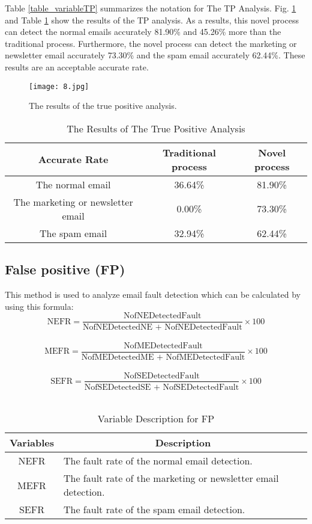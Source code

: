 \documentclass[conference]{IEEEtran}
\begin{document}
Table \ref{table_variableTP} summarizes the notation for The TP Analysis.
Fig. \ref{fig:resultTP} and Table \ref{table_resultsTP} show the results of the TP
analysis.
As a
results, this novel process can detect the normal emails accurately 81.90\% and 45.26\% more than the traditional process.
Furthermore, the novel process can detect the marketing or newsletter email accurately 73.30\% and the spam email accurately 62.44\%.
These results are an acceptable accurate
rate.

\begin{figure}
\centering
\texttt{[image: 8.jpg]}
\caption{The results of the true positive analysis.}
\label{fig:resultTP}
\end{figure}

\begin{table}[!t]
\renewcommand{\arraystretch}{1.2}
\caption{The Results of The True Positive Analysis}
\label{table_resultsTP}
\centering
\begin{tabular}{c|c|c}
\hline
\bfseries Accurate Rate & \bfseries Traditional process & \bfseries Novel process\\
\hline
The normal email & 36.64\% & 81.90\%\\
\hline
The marketing or newsletter email & 0.00\% & 73.30\%\\
\hline
The spam email & 32.94\% & 62.44\%\\
\hline
\end{tabular}
\end{table}

\subsection{False positive (FP)}
This method is used to analyze email fault detection which can be calculated by using this formula:\\
$$ \text{NEFR} =  \frac{\text{NofNEDetectedFault}}{\text{NofNEDetectedNE + NofNEDetectedFault}} \times 100 $$\\
$$ \text{MEFR} =  \frac{\text{NofMEDetectedFault}}{\text{NofMEDetectedME + NofMEDetectedFault}} \times 100 $$\\
$$ \text{SEFR} =  \frac{\text{NofSEDetectedFault}}{\text{NofSEDetectedSE + NofSEDetectedFault}} \times 100 $$\\

\begin{table}[!t]
\renewcommand{\arraystretch}{1.2}
\caption{Variable Description for FP}
\label{table_variableFP}
\centering
\begin{tabular}{c|l}
\hline
\bfseries Variables & \multicolumn{1}{c}{\bfseries Description}\\
\hline
NEFR & The fault rate of the normal email detection.\\
\hline
MEFR & The fault rate of the marketing or newsletter email detection.\\
\hline
SEFR & The fault rate of the spam email detection.\\
\hline
\end{tabular}
\end{table}
\end{document}
